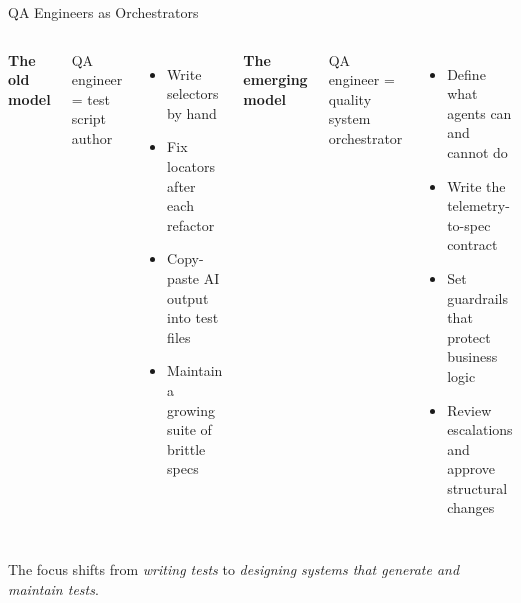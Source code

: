 \documentclass[aspectratio=169,10pt]{beamer}
\begin{document}
\begin{frame}{QA Engineers as Orchestrators}
  \begin{columns}[T]
      \textbf{The old model}

      \vspace{0.5em}
      QA engineer = test script author

      \vspace{0.4em}
      \begin{itemize}
        \setlength\itemsep{0.4em}
        \item Write selectors by hand
        \item Fix locators after each refactor
        \item Copy-paste AI output into test files
        \item Maintain a growing suite of brittle specs
      \end{itemize}

      \textbf{The emerging model}

      \vspace{0.5em}
      QA engineer = quality system orchestrator

      \vspace{0.4em}
      \begin{itemize}
        \setlength\itemsep{0.4em}
        \item Define what agents can and cannot do
        \item Write the telemetry-to-spec contract
        \item Set guardrails that protect business logic
        \item Review escalations and approve structural changes
      \end{itemize}
  \end{columns}

  \vspace{1em}
  \begin{exampleblock}{}
    \centering
    The focus shifts from \textit{writing tests} to \textit{designing systems that generate and maintain tests}.
  \end{exampleblock}
\end{frame}
\end{document}
